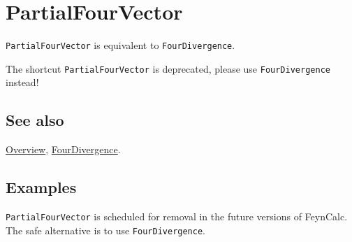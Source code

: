 \documentclass[../FeynCalcManual.tex]{subfiles}
\begin{document}
\hypertarget{partialfourvector}{%
\section{PartialFourVector}\label{partialfourvector}}

\texttt{PartialFourVector} is equivalent to \texttt{FourDivergence}.

The shortcut \texttt{PartialFourVector} is deprecated, please use
\texttt{FourDivergence} instead!

\subsection{See also}

\hyperlink{toc}{Overview}, \hyperlink{fourdivergence}{FourDivergence}.

\subsection{Examples}

\texttt{PartialFourVector} is scheduled for removal in the future
versions of FeynCalc. The safe alternative is to use
\texttt{FourDivergence}.
\end{document}

